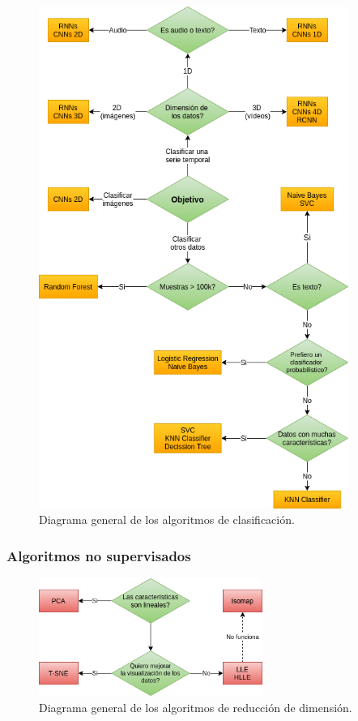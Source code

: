 \documentclass[a4paper,12pt]{article}
\begin{document}
\begin{figure}[H]
	\begin{center}				
		\includegraphics[width=0.9\textwidth]{classificationdiagram.png}
		\caption{Diagrama general de los algoritmos de clasificación.}
		\label{fig:classificationdiagram.}
	\end{center}
\end{figure}

\subsubsection{Algoritmos no supervisados}

\begin{figure}[H]
	\begin{center}				
		\includegraphics[width=0.65\textwidth]{dimreduxdiagram.png}
		\caption{Diagrama general de los algoritmos de reducción de dimensión.}
		\label{fig:dimreduxdiagram.}
	\end{center}
\end{figure}
\end{document}
